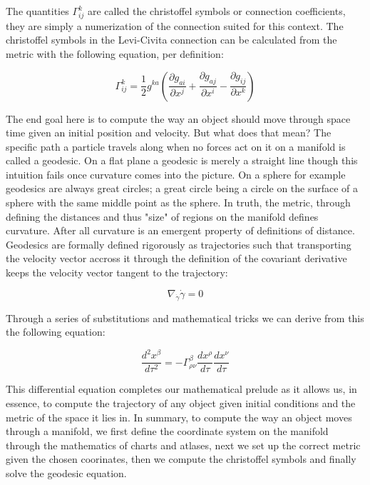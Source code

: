 \documentclass{article}
\begin{document}
The quantities $\Gamma^k_{ij}$ are called the christoffel symbols or connection coefficients, they are simply a numerization of the connection suited for this context. The christoffel symbols in the Levi-Civita connection can be calculated from the metric with the following equation, per definition:

\begin{equation*}
  \Gamma^k_{ij} = \frac{1}{2} g^{ka}(\frac{\partial g_{ai}}{\partial x^j} + \frac{\partial g_{aj}}{\partial x^i} - \frac{\partial g_{ij}}{\partial x^k})
\end{equation*}

The end goal here is to compute the way an object should move through space time given an initial position and velocity. But what does that mean? The specific path a particle travels along when no forces act on it on a manifold is called a geodesic. On a flat plane a geodesic is merely a straight line though this intuition fails once curvature comes into the picture. On a sphere for example geodesics are always great circles; a great circle being a circle on the surface of a sphere with the same middle point as the sphere. In truth, the metric, through defining the distances and thus "size" of regions on the manifold defines curvature. After all curvature is an emergent property of definitions of distance. Geodesics are formally defined rigorously as trajectories such that transporting the velocity vector accross it through the definition of the covariant derivative keeps the velocity vector tangent to the trajectory:

\begin{equation*}
  \nabla_{\dot \gamma} \dot \gamma = 0
\end{equation*}

Through a series of substitutions and mathematical tricks we can derive from this the following equation:

\begin{equation*}
  \frac{d^2 x^{\beta}}{d \tau^2} = - \Gamma^\beta_{\rho \nu} \frac{dx^\rho}{d \tau} \frac{dx^\nu}{d \tau}
\end{equation*}

This differential equation completes our mathematical prelude as it allows us, in essence, to compute the trajectory of any object given initial conditions and the metric of the space it lies in. In summary, to compute the way an object moves through a manifold, we first define the coordinate system on the manifold through the mathematics of charts and atlases, next we set up the correct metric given the chosen coorinates, then we compute the christoffel symbols and finally solve the geodesic equation. 
\end{document}
